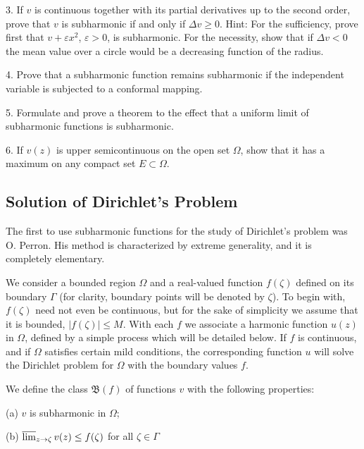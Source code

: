 3. If $v$ is continuous together with its partial derivatives up to the second order, prove that $v$ is subharmonic if and only if $\Delta v \geq 0$. Hint: For the sufficiency, prove first that $v + \varepsilon x^{2}$, $\varepsilon > 0$, is subharmonic. For the necessity, show that if $\Delta v < 0$ the mean value over a circle would be a decreasing function of the radius.

4. Prove that a subharmonic function remains subharmonic if the independent variable is subjected to a conformal mapping.

5. Formulate and prove a theorem to the effect that a uniform limit of subharmonic functions is subharmonic.

6. If $v(z)$ is upper semicontinuous on the open set $\Omega$, show that it has a maximum on any compact set $E \subset \Omega$.

\setcounter{section}{4}\setcounter{subsection}{1}\subsection{Solution of Dirichlet's Problem}\label{sec:6.4.2}
The first to use subharmonic functions for the study of Dirichlet's problem was O. Perron. His method is characterized by extreme generality, and it is completely elementary.

We consider a bounded region $\Omega$ and a real-valued function $f(\zeta)$ defined on its boundary $\Gamma$ (for clarity, boundary points will be denoted by $\zeta$). To begin with, $f(\zeta)$ need not even be continuous, but for the sake of simplicity we assume that it is bounded, $|f(\zeta)| \leq M$. With each $f$ we associate a harmonic function $u(z)$ in $\Omega$, defined by a simple process which will be detailed below. If $f$ is continuous, and if $\Omega$ satisfies certain mild conditions, the corresponding function $u$ will solve the Dirichlet problem for $\Omega$ with the boundary values $f$.

We define the class $\mathfrak{B}(f)$ of functions $v$ with the following properties:

(a) $v$ is subharmonic in $\Omega$;

(b) $\varlimsup_{z\to \zeta}v(z)\leq f(\zeta)$ for all $\zeta \in \Gamma$

